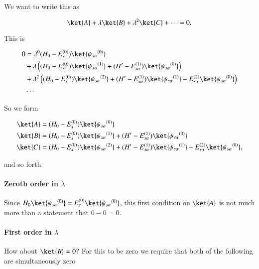 We want to write this as

\begin{equation}\label{eqn:qmTwoL5a:400}
\ket{A} + \lambda \ket{B} + \lambda^2 \ket{C} + \cdots = 0.
\end{equation}

This is

\begin{equation}\label{eqn:qmTwoL5a:420}
\begin{aligned}
0 &=
\lambda^0
(H_0 - E_s^{(0)}) \ket{{\psi_{s \alpha}}^{(0)}}  \\
&+ \lambda
\left(
(H_0 - E_s^{(0)}) \ket{{\psi_{s \alpha}}^{(1)}} 
+(H' - E_{s \alpha}^{(1)}) \ket{{\psi_{s \alpha}}^{(0)}} 
\right) \\
&+ \lambda^2
\left(
(H_0 - E_s^{(0)}) \ket{{\psi_{s \alpha}}^{(2)}} 
+(H' - E_{s \alpha}^{(1)}) \ket{{\psi_{s \alpha}}^{(1)}} 
-E_{s \alpha}^{(2)} \ket{{\psi_{s \alpha}}^{(0)}} 
\right) \\
&\cdots
\end{aligned}
\end{equation}

So we form

\begin{align}\label{eqn:qmTwoL5a:440}
\ket{A} &=
(H_0 - E_s^{(0)}) \ket{{\psi_{s \alpha}}^{(0)}} \\
\ket{B} &=
(H_0 - E_s^{(0)}) \ket{{\psi_{s \alpha}}^{(1)}} 
+(H' - E_{s \alpha}^{(1)}) \ket{{\psi_{s \alpha}}^{(0)}} \\
\ket{C} &=
(H_0 - E_s^{(0)}) \ket{{\psi_{s \alpha}}^{(2)}} 
+(H' - E_{s \alpha}^{(1)}) \ket{{\psi_{s \alpha}}^{(1)}} 
-E_{s \alpha}^{(2)} \ket{{\psi_{s \alpha}}^{(0)}},
\end{align}

and so forth.

\paragraph{Zeroth order in $\lambda$}

Since $H_0 \ket{{\psi_{s \alpha}}^{(0)}} = E_s^{(0)} \ket{{\psi_{s \alpha}}^{(0)}}$, this first condition on $\ket{A}$ is not much more than a statement that $0 - 0 = 0$.  

\paragraph{First order in $\lambda$}

How about $\ket{B} = 0$?  For this to be zero we require that both of the following are simultaneously zero

